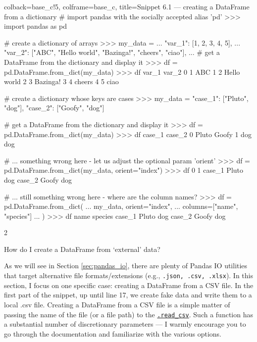 \documentclass[a4paper,11pt]{book}
\newcommand{\question}[1]{%
    \begin{tcolorbox}[colback=comp_c!10,colframe=comp_c,sidebyside align=top,width=\linewidth,before skip=1ex]
        #1
    \end{tcolorbox}
    \switchcolumn%
}
\newcommand{\note}[1]{%
    \begin{tcolorbox}[colback=white!0,colframe=white!10,width=\linewidth,before skip=1ex]
        #1
    \end{tcolorbox}
}
\begin{document}
\begin{pythoncode}[linenos=true,]{colback=base_c!5, colframe=base_c, title=\sffamily Snippet 6.1 --- creating a DataFrame from a dictionary}
# import pandas with the socially accepted alias 'pd'
>>> import pandas as pd

# create a dictionary of arrays
>>> my_data = {
...         "var_1": [1, 2, 3, 4, 5],
...         "var_2": ["ABC", "Hello world", "Bazinga!", "cheers", "ciao"],
...     }
# get a DataFrame from the dictionary and display it
>>> df = pd.DataFrame.from_dict(my_data)
>>> df
   var_1        var_2
0      1          ABC
1      2  Hello world
2      3     Bazinga!
3      4       cheers
4      5         ciao

# create a dictionary whose keys are cases
>>> my_data = {"case_1": ["Pluto", "dog"], "case_2": ["Goofy", "dog"]}


# get a DataFrame from the dictionary and display it
>>> df = pd.DataFrame.from_dict(my_data)
>>> df
  case_1 case_2
0  Pluto  Goofy
1    dog    dog

# ... something wrong here - let us adjust the optional param 'orient'
>>> df = pd.DataFrame.from_dict(my_data, orient="index")
>>> df
            0    1
case_1  Pluto  dog
case_2  Goofy  dog

# ... still something wrong here - where are the column names?
>>> df = pd.DataFrame.from_dict(
... 	my_data, orient="index",
... 	columns=["name", "species"]
... 	)
>>> df
         name species
case_1  Pluto     dog
case_2  Goofy     dog
\end{pythoncode}

\begin{paracol}{2}
	\question{\raggedright How do I create a DataFrame from `external' data?}
	\note{As we will see in Section \ref{sec:pandas_io}, there are plenty of Pandas IO utilities that target alternative file formats/extensions (e.g., \texttt{.json, .csv, .xlsx}). In this section, I focus on one specific case: creating a DataFrame from a CSV file. In the first part of the snippet, up until line 17, we create fake data and write them to a local .csv file. Creating a DataFrame from a CSV file is a simple matter of passing the name of the file (or a file path) to the \href{https://pandas.pydata.org/docs/reference/api/pandas.read_csv.html?highlight=read_csv\#pandas.read_csv}{\texttt{.read\_csv}}. Such a function has a substantial number of discretionary parameters --- I warmly encourage you to go through the documentation and familiarize with the various options.}
\end{paracol}
\end{document}
